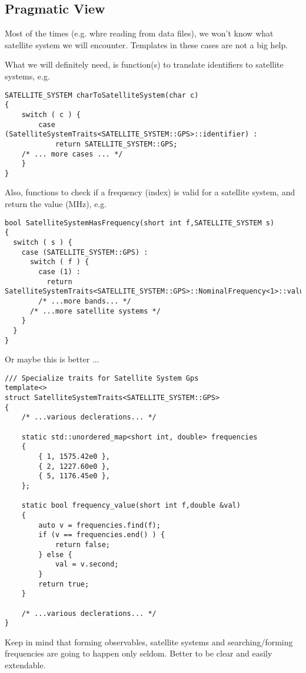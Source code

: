 \documentclass{article}
\begin{document}
\subsection{Pragmatic View}
Most of the times (e.g. whre reading from data files), we won't know what satellite system
we will encounter. Templates in these cases are not a big help.

What we will definitely need, is function(s) to translate identifiers to satellite systems,
e.g. 

\begin{lstlisting}
SATELLITE_SYSTEM charToSatelliteSystem(char c)
{
    switch ( c ) {
        case (SatelliteSystemTraits<SATELLITE_SYSTEM::GPS>::identifier) :
            return SATELLITE_SYSTEM::GPS;
    /* ... more cases ... */
    }
}
\end{lstlisting}

Also, functions to check if a frequency (index) is valid for a satellite system, and
return the value (MHz), e.g.

\begin{lstlisting}
bool SatelliteSystemHasFrequency(short int f,SATELLITE_SYSTEM s)
{
  switch ( s ) {
    case (SATELLITE_SYSTEM::GPS) :
      switch ( f ) {
        case (1) :
          return SatelliteSystemTraits<SATELLITE_SYSTEM::GPS>::NominalFrequency<1>::value;
        /* ...more bands... */
      /* ...more satellite systems */
    }
  }
}
\end{lstlisting}

Or maybe this is better ...
\begin{lstlisting}
/// Specialize traits for Satellite System Gps
template<>
struct SatelliteSystemTraits<SATELLITE_SYSTEM::GPS>
{
    /* ...various declerations... */
    
    static std::unordered_map<short int, double> frequencies
    {
        { 1, 1575.42e0 },
        { 2, 1227.60e0 },
        { 5, 1176.45e0 },
    };
    
    static bool frequency_value(short int f,double &val)
    {
        auto v = frequencies.find(f);
        if (v == frequencies.end() ) {
            return false;
        } else {
            val = v.second;
        }
        return true;
    }
    
    /* ...various declerations... */
}
\end{lstlisting}

Keep in mind that forming observables, satellite systems and searching/forming frequencies
are going to happen only seldom. Better to be clear and easily extendable.
\end{document}
